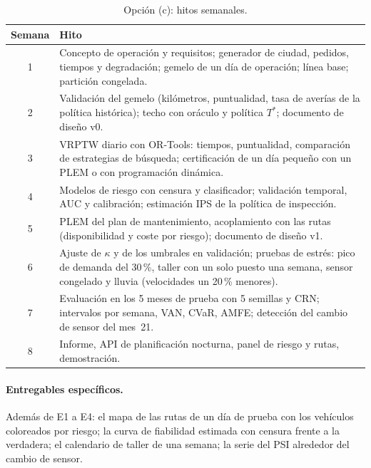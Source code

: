 \begin{table}[H]
\centering\small
\caption{Opción (c): hitos semanales.}\label{tab:hitos-c}
\begin{tabularx}{\textwidth}{@{}c>{\raggedright\arraybackslash}X@{}}
\toprule
Semana & Hito \\
\midrule
1 & Concepto de operación y requisitos; generador de ciudad, pedidos, tiempos y degradación; gemelo de un día de operación; línea base; partición congelada. \\
2 & Validación del gemelo (kilómetros, puntualidad, tasa de averías de la política histórica); techo con oráculo y política $T^{\ast}$; documento de diseño v0. \\
3 & VRPTW diario con OR-Tools: tiempos, puntualidad, comparación de estrategias de búsqueda; certificación de un día pequeño con un PLEM o con programación dinámica. \\
4 & Modelos de riesgo con censura y clasificador; validación temporal, AUC y calibración; estimación IPS de la política de inspección. \\
5 & PLEM del plan de mantenimiento, acoplamiento con las rutas (disponibilidad y coste por riesgo); documento de diseño v1. \\
6 & Ajuste de $\kappa$ y de los umbrales en validación; pruebas de estrés: pico de demanda del 30\,\%, taller con un solo puesto una semana, sensor congelado y lluvia (velocidades un 20\,\% menores). \\
7 & Evaluación en los 5 meses de prueba con 5 semillas y CRN; intervalos por semana, VAN, CVaR, AMFE; detección del cambio de sensor del mes~21. \\
8 & Informe, API de planificación nocturna, panel de riesgo y rutas, demostración. \\
\bottomrule
\end{tabularx}
\end{table}

\paragraph{Entregables específicos.} Además de E1 a E4: el mapa de las rutas de un día de prueba con los vehículos coloreados por riesgo; la curva de fiabilidad estimada con censura frente a la verdadera; el calendario de taller de una semana; la serie del PSI alrededor del cambio de sensor.

